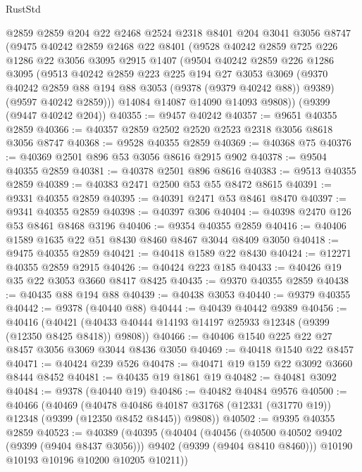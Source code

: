 \begin{lexlean}{RustStd}
\begin{coremodule}
    @2859
    @2859
    @204
    @22
    @2468
    @2524
    @2318
    @8401
    @204
    @3041
    @3056
    @8747
    (@9475
      @40242
      @2859
      @2468
      @22
      @8401
      (@9528
        @40242
        @2859
        @725
        @226
        @1286
        @22
        @3056
        @3095
        @2915
        @1407
        (@9504
          @40242
          @2859
          @226
          @1286
          @3095
          (@9513
            @40242
            @2859
            @223
            @225
            @194
            @27
            @3053
            @3069
            (@9370 @40242 @2859 @88 @194 @88 @3053 (@9378 (@9379 @40242 @88)) @9389)
            (@9597 @40242 @2859)))
        @14084
        @14087
        @14090
        @14093
        @9808))
    (@9399 (@9447 @40242 @204))
@40355 := @9457 @40242
@40357 := @9651 @40355 @2859
@40366 := @40357 @2859 @2502 @2520 @2523 @2318 @3056 @8618 @3056 @8747
@40368 := @9528 @40355 @2859
@40369 := @40368 @75
@40376 := @40369 @2501 @896 @53 @3056 @8616 @2915 @902
@40378 := @9504 @40355 @2859
@40381 := @40378 @2501 @896 @8616
@40383 := @9513 @40355 @2859
@40389 := @40383 @2471 @2500 @53 @55 @8472 @8615
@40391 := @9331 @40355 @2859
@40395 := @40391 @2471 @53 @8461 @8470
@40397 := @9341 @40355 @2859
@40398 := @40397 @306
@40404 := @40398 @2470 @126 @53 @8461 @8468 @3196
@40406 := @9354 @40355 @2859
@40416 := @40406 @1589 @1635 @22 @51 @8430 @8460 @8467 @3044 @8409 @3050
@40418 := @9475 @40355 @2859
@40421 := @40418 @1589 @22 @8430
@40424 := @12271 @40355 @2859 @2915
@40426 := @40424 @223 @185
@40433 := @40426 @19 @35 @22 @3053 @3660 @8417 @8425
@40435 := @9370 @40355 @2859
@40438 := @40435 @88 @194 @88
@40439 := @40438 @3053
@40440 := @9379 @40355
@40442 := @9378 (@40440 @88)
@40444 := @40439 @40442 @9389
@40456 := @40416
    (@40421 (@40433 @40444 @14193 @14197 @25933 @12348 (@9399 (@12350 @8425 @8418)) @9808))
@40466 := @40406 @1540 @225 @22 @27 @8457 @3056 @3069 @3044 @8436 @3050
@40469 := @40418 @1540 @22 @8457
@40471 := @40424 @239 @526
@40478 := @40471 @19 @159 @22 @3092 @3660 @8444 @8452
@40481 := @40435 @19 @1861 @19
@40482 := @40481 @3092
@40484 := @9378 (@40440 @19)
@40486 := @40482 @40484 @9576
@40500 := @40466
    (@40469
      (@40478 @40486 @40187 @31768 (@12331 (@31770 @19)) @12348 (@9399 (@12350 @8452 @8445)) @9808))
@40502 := @9395 @40355 @2859
@40523 := @40389
    (@40395
      (@40404
        (@40456 (@40500 @40502 @9402 (@9399 (@9404 @8437 @3056))) @9402 (@9399 (@9404 @8410 @8460)))
        @10190
        @10193
        @10196
        @10200
        @10205
        @10211))

\end{coremodule}
\end{lexlean}
